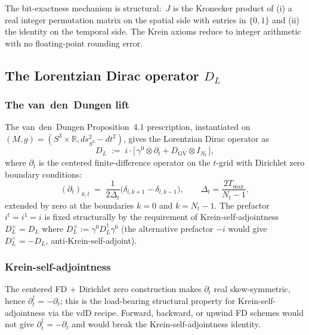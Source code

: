 \documentclass[11pt,a4paper]{article}
\theoremstyle{plain}
\theoremstyle{definition}
\newcommand{\Nt}{N_t}
\newcommand{\sthree}{S^{3}}
\newcommand{\R}{\mathbb{R}}
\newcommand{\DGV}{D_{\mathrm{GV}}}
\newcommand{\DL}{D_{L}}
\begin{document}
The bit-exactness mechanism is structural:\ $J$ is the Kronecker
product of (i) a real integer permutation matrix on the spatial side
with entries in $\{0, 1\}$ and (ii) the identity on the temporal side.
The Krein axioms reduce to integer arithmetic with no floating-point
rounding error.

\subsection{The Lorentzian Dirac operator $\DL$}\label{sec:lorentzian_dirac}

\subsubsection{The van~den~Dungen lift}

The van~den~Dungen Proposition~4.1 prescription, instantiated on
$(M, g) = (\sthree \times \R, ds^2_{\sthree} - dt^2)$, gives the
Lorentzian Dirac operator as
\begin{equation}\label{eq:DL_def}
   \DL \;:=\; i \cdot \bigl[\, \gamma^0 \otimes \partial_t
                              + \DGV \otimes I_{\Nt} \,\bigr],
\end{equation}
where $\partial_t$ is the centered finite-difference operator on the
$t$-grid with Dirichlet zero boundary conditions:
\begin{equation}\label{eq:partial_t}
   (\partial_t)_{k, l}
   \;=\; \frac{1}{2 \Delta_t}\bigl(\delta_{l, k+1} - \delta_{l, k-1}\bigr),
   \qquad \Delta_t = \frac{2 T_{\max}}{\Nt - 1},
\end{equation}
extended by zero at the boundaries $k = 0$ and $k = \Nt - 1$. The
prefactor $i^t = i^1 = i$ is fixed structurally by the requirement
of Krein-self-adjointness $\DL^\times = \DL$ where $\DL^\times :=
\gamma^0 \DL^\dagger \gamma^0$ (the alternative prefactor $-i$ would
give $\DL^\times = -\DL$, anti-Krein-self-adjoint).

\subsubsection{Krein-self-adjointness}

The centered FD + Dirichlet zero construction makes $\partial_t$ real
skew-symmetric, hence $\partial_t^\dagger = -\partial_t$; this is the
load-bearing structural property for Krein-self-adjointness via the
vdD recipe. Forward, backward, or upwind FD schemes would not give
$\partial_t^\dagger = -\partial_t$ and would break the
Krein-self-adjointness identity.
\end{document}
